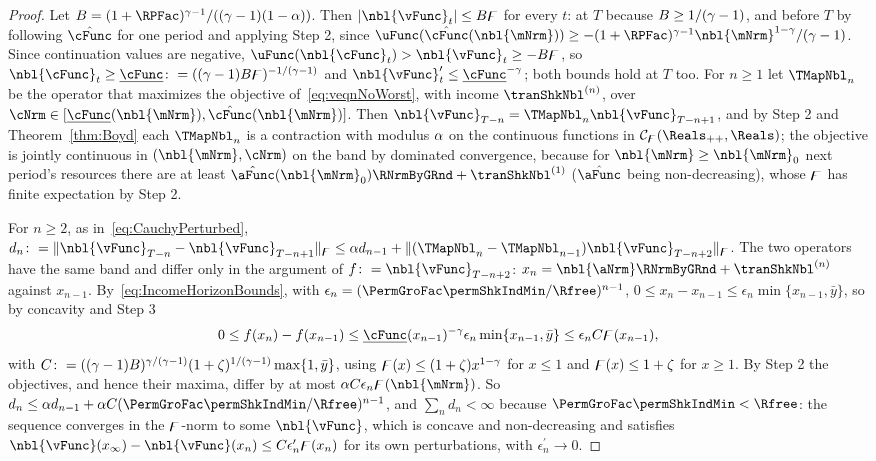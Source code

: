 \documentclass[\econtexRoot/BufferStockTheory]{subfiles}
\begin{document}
\begin{proof}
Let $B=(1+\RPFac)^{\CRRA-1}/((\CRRA-1)(1-\Shrinker))$.
Then $\vert\nbl{\vFunc}_{t}\vert\leq B\boundFunc$ for every $t$: at $T$ because $B\geq 1/(\gamma-1)$, and before $T$ by following $\hat{\cFunc}$ for one period and applying Step 2, since $\uFunc(\hat{\cFunc}(\nbl{\mNrm}))\geq-(1+\RPFac)^{\CRRA-1}\nbl{\mNrm}^{1-\CRRA}/(\CRRA-1)$.
Since continuation values are negative, $\uFunc(\nbl{\cFunc}_{t})>\nbl{\vFunc}_{t}\geq-B\boundFunc$, so $\nbl{\cFunc}_{t}\geq\underline{\cFunc}\colon=((\CRRA-1)B\boundFunc)^{-1/(\CRRA-1)}$ and $\nbl{\vFunc}_{t}^{\prime}\leq\underline{\cFunc}^{-\CRRA}$; both bounds hold at $T$ too.
For $n\geq 1$ let $\TMapNbl_{n}$ be the operator that maximizes the objective of~\eqref{eq:veqnNoWorst}, with income $\tranShkNbl^{(n)}$, over $\cNrm\in[\underline{\cFunc}(\nbl{\mNrm}),\hat{\cFunc}(\nbl{\mNrm})]$.
Then $\nbl{\vFunc}_{T-n}=\TMapNbl_{n}\nbl{\vFunc}_{T-n+1}$, and by Step 2 and Theorem~\ref{thm:Boyd} each $\TMapNbl_{n}$ is a contraction with modulus $\alpha$ on the continuous functions in $\mathcal{C}_{\boundFunc}(\Reals_{++},\Reals)$; the objective is jointly continuous in $(\nbl{\mNrm},\cNrm)$ on the band by dominated convergence, because for $\nbl{\mNrm}\geq\nbl{\mNrm}_{0}$ next period's resources there are at least $\hat{\aFunc}(\nbl{\mNrm}_{0})\RNrmByGRnd+\tranShkNbl^{(1)}$ ($\hat{\aFunc}$ being non-decreasing), whose $\digamma$ has finite expectation by Step 2.

For $n\geq 2$, as in~\eqref{eq:CauchyPerturbed}, $d_{n}\colon=\Vert\nbl{\vFunc}_{T-n}-\nbl{\vFunc}_{T-n+1}\Vert_{\boundFunc}\leq\Shrinker d_{n-1}+\Vert(\TMapNbl_{n}-\TMapNbl_{n-1})\nbl{\vFunc}_{T-n+2}\Vert_{\boundFunc}$.
The two operators have the same band and differ only in the argument of $f\colon=\nbl{\vFunc}_{T-n+2}$: $x_{n}=\nbl{\aNrm}\RNrmByGRnd+\tranShkNbl^{(n)}$ against $x_{n-1}$.
By~\eqref{eq:IncomeHorizonBounds}, with $\epsilon_{n}=(\PermGroFac\permShkIndMin/\Rfree)^{n-1}$, $0\leq x_{n}-x_{n-1}\leq\epsilon_{n}\min\{x_{n-1},\bar{y}\}$, so by concavity and Step 3
\begin{equation*}
  0\leq f(x_{n})-f(x_{n-1})\leq\underline{\cFunc}(x_{n-1})^{-\CRRA}\epsilon_{n}\min\{x_{n-1},\bar{y}\}\leq\epsilon_{n}C\boundFunc(x_{n-1}),
\end{equation*}
with $C\colon=((\gamma-1)B)^{\gamma/(\gamma-1)}(1+\zeta)^{1/(\gamma-1)}\max\{1,\bar{y}\}$, using $\digamma(x)\leq(1+\zeta)x^{1-\gamma}$ for $x\leq 1$ and $\digamma(x)\leq 1+\zeta$ for $x\geq 1$.
By Step 2 the objectives, and hence their maxima, differ by at most $\Shrinker C\epsilon_{n}\boundFunc(\nbl{\mNrm})$.
So $d_{n}\leq\Shrinker d_{n-1}+\Shrinker C(\PermGroFac\permShkIndMin/\Rfree)^{n-1}$, and $\sum_{n}d_{n}<\infty$ because $\PermGroFac\permShkIndMin<\Rfree$: the sequence converges in the $\digamma$-norm to some $\nbl{\vFunc}$, which is concave and non-decreasing and satisfies $\nbl{\vFunc}(x_{\infty})-\nbl{\vFunc}(x_{n})\leq C\epsilon_{n}^{\prime}\boundFunc(x_{n})$ for its own perturbations, with $\epsilon_{n}^{\prime}\rightarrow 0$.


\end{proof}
\end{document}
